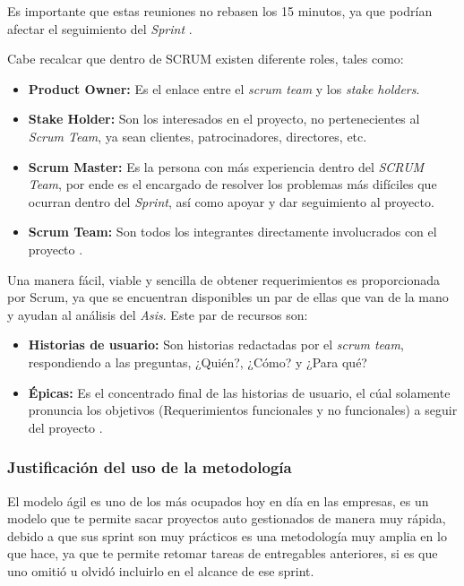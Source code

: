 \documentclass[10pt]{article}
\begin{document}
\setlength{\parskip}{2mm}

Es importante que estas reuniones no rebasen los 15 minutos, ya que podrían afectar el seguimiento del \textit{Sprint} \cite{IEEEreferencias:Ref24}.

\setlength{\parskip}{2mm}

Cabe recalcar que dentro de SCRUM existen diferente roles, tales como:
\begin{itemize}
    \item \textbf{Product Owner:} Es el enlace entre el \textit{scrum team} y los \textit{stake holders}.
    \item \textbf{Stake Holder:} Son los interesados en el proyecto, no pertenecientes al \textit{Scrum Team}, ya sean clientes, patrocinadores, directores, etc.
    \item \textbf{Scrum Master:} Es la persona con más experiencia dentro del \textit{SCRUM Team}, por ende es el encargado de resolver los problemas más difíciles que ocurran dentro del \textit{Sprint}, así como apoyar y dar seguimiento al proyecto.
    \item \textbf{Scrum Team:} Son todos los integrantes directamente involucrados con el proyecto \cite{IEEEreferencias:Ref24}.
\end{itemize}

Una manera fácil, viable y sencilla de obtener requerimientos es proporcionada por Scrum, ya que se encuentran disponibles un par de ellas que van de la mano y ayudan al análisis del \textit{Asis}. Este par de recursos son: 

\begin{itemize}
    \item \textbf{Historias de usuario:} Son historias redactadas por el \textit{scrum team}, respondiendo a las preguntas, ¿Quién?, ¿Cómo? y ¿Para qué?
    \item \textbf{Épicas:} Es el concentrado final de las historias de usuario, el cúal solamente pronuncia los objetivos (Requerimientos funcionales y no funcionales) a seguir del proyecto \cite{IEEEreferencias:Ref24}.
\end{itemize}
\newpage
\subsubsection{Justificación del uso de la metodología}

El modelo ágil es uno de los más ocupados hoy en día en las empresas, es un modelo que te permite sacar proyectos auto gestionados de manera muy rápida, debido a que sus sprint son muy prácticos es una metodología muy amplia en lo que hace, ya que te permite retomar tareas de entregables anteriores, si es que uno omitió u olvidó incluirlo en el alcance de ese sprint.
\end{document}
